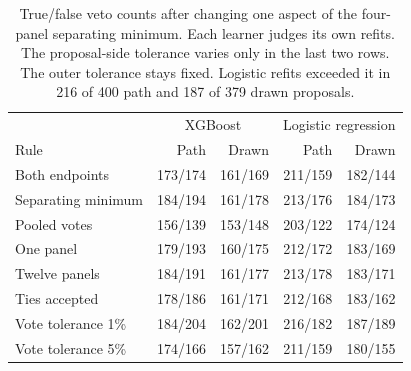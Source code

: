 \begin{table}[tb]
\centering
\caption{True/false veto counts after changing one aspect of the four-panel separating minimum. Each learner judges its own refits. The proposal-side tolerance varies only in the last two rows. The outer tolerance stays fixed. Logistic refits exceeded it in 216 of 400 path and 187 of 379 drawn proposals.}
\label{tab:operating-rules}
\small\setlength{\tabcolsep}{3pt}
\begin{tabular}{@{}lrr@{\quad}rr@{}}
\toprule
&\multicolumn{2}{c}{XGBoost}&\multicolumn{2}{c}{Logistic regression}\\
Rule & Path & Drawn & Path & Drawn \\
\midrule
Both endpoints & 173/174 & 161/169 & 211/159 & 182/144 \\
Separating minimum & 184/194 & 161/178 & 213/176 & 184/173 \\
Pooled votes & 156/139 & 153/148 & 203/122 & 174/124 \\
One panel & 179/193 & 160/175 & 212/172 & 183/169 \\
Twelve panels & 184/191 & 161/177 & 213/178 & 183/171 \\
Ties accepted & 178/186 & 161/171 & 212/168 & 183/162 \\
Vote tolerance 1\% & 184/204 & 162/201 & 216/182 & 187/189 \\
Vote tolerance 5\% & 174/166 & 157/162 & 211/159 & 180/155 \\
\bottomrule
\end{tabular}
\end{table}
